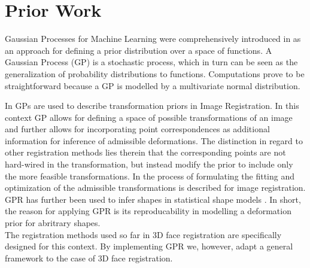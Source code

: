 \section{Prior Work}
Gaussian Processes for Machine Learning were comprehensively introduced in \cite{GP}
as an approach for defining a prior distribution over a space of functions. A Gaussian Process (GP) is a stochastic process, which in turn can be seen as the generalization of probability distributions to functions. Computations prove to be straightforward because a GP is modelled by a multivariate normal distribution.\begin{comment}In the Graphics and Vision Group at the University of Basel Gaussian Processes have so far been used to describe transformation priors in Image
Registration\end{comment} In \cite{deformprior} GPs are used to describe transformation priors in Image Registration. In this context GP allows for defining a space of possible transformations of an image and further allows for incorporating point correspondences as additional information for inference of admissible deformations. The distinction in regard to other registration methods lies therein that the corresponding points are not hard-wired in the transformation, but instead modify the prior to include only the
more feasible transformations. In \cite{fitting} the process of
formulating the fitting and optimization of the admissible transformations is described for image registration. GPR has further been used to infer shapes in statistical shape models \cite{shapemodels}. In short, the reason for applying GPR is its reproducability in modelling a deformation prior for abritrary shapes.\\ 
The registration methods used so far in 3D face registration \cite{amberg} are specifically designed for this context. By implementing GPR we, however, adapt a general framework to the case of 3D face registration. 
\begin{comment} In effect, the advantage of our application of GPR to the problem of 3D face registration is it is based on a general framework and the based on Bayesian Machine Learning Theory, allows for the easy incorporation of a priori known correspondences and is therefore highly customizable.\end{comment}

